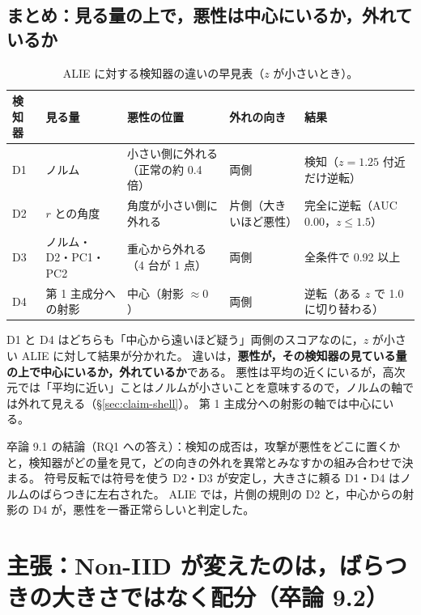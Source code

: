 \documentclass[a4j, dvipdfmx]{jsarticle}  %
\begin{document}
\subsection{まとめ：見る量の上で，悪性は中心にいるか，外れているか}
\label{sec:claim-alie-summary}

\begin{table}[H]
\centering
\caption{ALIE に対する検知器の違いの早見表（$z$ が小さいとき）。}
\label{tab:alie-summary}
\small
\begin{tabular}{@{}l P{2.6cm} P{4.1cm} P{2.6cm} P{4.0cm}@{}}
\toprule
検知器 & 見る量 & 悪性の位置 & 外れの向き & 結果 \\
\midrule
D1 & ノルム & 小さい側に外れる（正常の約 0.4 倍） & 両側 & 検知（$z = 1.25$ 付近だけ逆転） \\
D2 & $r$ との角度 & 角度が小さい側に外れる & 片側（大きいほど悪性） & 完全に逆転（AUC 0.00，$z \le 1.5$） \\
D3 & ノルム・D2・PC1・PC2 & 重心から外れる（4 台が 1 点） & 両側 & 全条件で 0.92 以上 \\
D4 & 第 1 主成分への射影 & 中心（射影 $\approx 0$） & 両側 & 逆転（ある $z$ で 1.0 に切り替わる） \\
\bottomrule
\end{tabular}
\end{table}

D1 と D4 はどちらも「中心から遠いほど疑う」両側のスコアなのに，$z$ が小さい ALIE に対して結果が分かれた。
違いは，\textbf{悪性が，その検知器の見ている量の上で中心にいるか，外れているか}である。
悪性は平均の近くにいるが，高次元では「平均に近い」ことはノルムが小さいことを意味するので，ノルムの軸では外れて見える（\S\ref{sec:claim-shell}）。
第 1 主成分への射影の軸では中心にいる。

卒論 9.1 の結論（RQ1 への答え）：検知の成否は，攻撃が悪性をどこに置くかと，検知器がどの量を見て，どの向きの外れを異常とみなすかの組み合わせで決まる。
符号反転では符号を使う D2・D3 が安定し，大きさに頼る D1・D4 はノルムのばらつきに左右された。
ALIE では，片側の規則の D2 と，中心からの射影の D4 が，悪性を一番正常らしいと判定した。

\section{主張：Non-IID が変えたのは，ばらつきの大きさではなく配分（卒論 9.2）}
\label{sec:claim-noniid}
\end{document}
